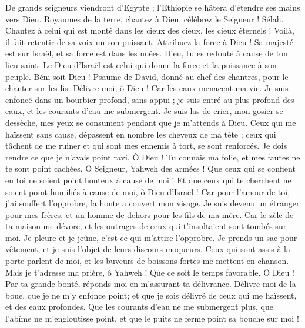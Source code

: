 \begin{multicols}{2}
De grands seigneurs viendront d'Egypte ; l'Ethiopie se hâtera d'étendre ses mains vers Dieu.
Royaumes de la terre, chantez à Dieu, célébrez le Seigneur ! Sélah.
Chantez à celui qui est monté dans les cieux des cieux, les cieux éternels ! Voilà, il fait retentir de sa voix un son puissant.
Attribuez la force à Dieu ! Sa majesté est sur Israël, et sa force est dans les nuées.
Dieu, tu es redouté à cause de ton lieu saint. Le Dieu d'Israël est celui qui donne la force et la puissance à son peuple. Béni soit Dieu !
\VerseOne{}Psaume de David, donné au chef des chantres, pour le chanter sur les lis.
Délivre-moi, ô Dieu ! Car les eaux menacent ma vie.
Je suis enfoncé dans un bourbier profond, sans appui ; je suis entré au plus profond des eaux, et les courants d'eau me submergent.
Je suis las de crier, mon gosier se dessèche, mes yeux se consument pendant que je m'attends à Dieu.
Ceux qui me haïssent sans cause, dépassent en nombre les cheveux de ma tête ; ceux qui tâchent de me ruiner et qui sont mes ennemis à tort, se sont renforcés. Je dois rendre ce que je n'avais point ravi.
Ô Dieu ! Tu connais ma folie, et mes fautes ne te sont point cachées.
Ô Seigneur, Yahweh des armées ! Que ceux qui se confient en toi ne soient point honteux à cause de moi ! Et que ceux qui te cherchent ne soient point humiliés à cause de moi, ô Dieu d'Israël !
Car pour l'amour de toi, j'ai souffert l'opprobre, la honte a couvert mon visage.
Je suis devenu un étranger pour mes frères, et un homme de dehors pour les fils de ma mère.
Car le zèle de ta maison me dévore, et les outrages de ceux qui t'insultaient sont tombés sur moi.
Je pleure et je jeûne, c'est ce qui m'attire l'opprobre.
Je prends un sac pour vêtement, et je suis l'objet de leurs discours moqueurs.
Ceux qui sont assis à la porte parlent de moi, et les buveurs de boissons fortes me mettent en chanson.
Mais je t'adresse ma prière, ô Yahweh ! Que ce soit le temps favorable. Ô Dieu ! Par ta grande bonté, réponds-moi en m'assurant ta délivrance.
Délivre-moi de la boue, que je ne m'y enfonce point; et que je sois délivré de ceux qui me haïssent, et des eaux profondes.
Que les courants d'eau ne me submergent plus, que l'abîme ne m'engloutisse point, et que le puits ne ferme point sa bouche sur moi !

\end{multicols}
